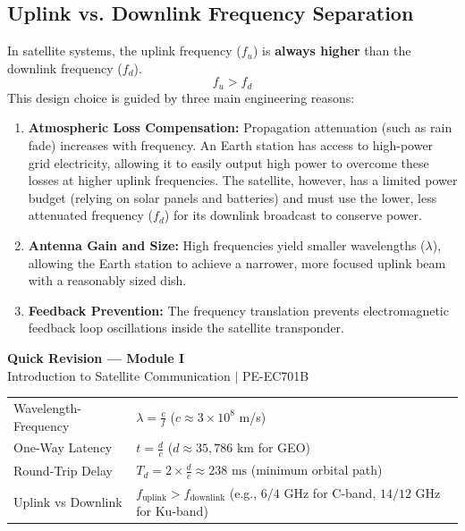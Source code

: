 \documentclass[12pt,a4paper]{article}
\renewcommand{\arraystretch}{1.45}
\begin{document}
\subsection{Uplink vs. Downlink Frequency Separation}
In satellite systems, the uplink frequency ($f_u$) is \textbf{always higher} than the downlink frequency ($f_d$).
\begin{equation}
  f_u > f_d
\end{equation}
This design choice is guided by three main engineering reasons:
\begin{enumerate}[label=\textbf{\alph*.}, leftmargin=*, itemsep=2pt]
  \item \textbf{Atmospheric Loss Compensation:} Propagation attenuation (such as rain fade) increases with frequency. An Earth station has access to high-power grid electricity, allowing it to easily output high power to overcome these losses at higher uplink frequencies. The satellite, however, has a limited power budget (relying on solar panels and batteries) and must use the lower, less attenuated frequency ($f_d$) for its downlink broadcast to conserve power.
  \item \textbf{Antenna Gain and Size:} High frequencies yield smaller wavelengths ($\lambda$), allowing the Earth station to achieve a narrower, more focused uplink beam with a reasonably sized dish.
  \item \textbf{Feedback Prevention:} The frequency translation prevents electromagnetic feedback loop oscillations inside the satellite transponder.
\end{enumerate}

\newpage
\begin{center}
  {\large\bfseries\color{myred} Quick Revision --- Module I}\\[3pt]
  {\small\color{mydark} Introduction to Satellite Communication $|$ PE-EC701B}
\end{center}
\noindent{\color{myred}\rule{\linewidth}{1.2pt}}
\vspace{4pt}

\begin{tcolorbox}[formulabox, title={\textbf{Key Formulas at a Glance}}]
\renewcommand{\arraystretch}{1.3}
\begin{tabularx}{\linewidth}{B{4.5cm} X}Wavelength-Frequency & $\lambda = \frac{c}{f}$ \quad ($c \approx 3 \times 10^8$ m/s) \\[6pt]
One-Way Latency & $t = \frac{d}{c}$ \quad ($d \approx 35,786$ km for GEO) \\[6pt]
Round-Trip Delay & $T_d = 2 \times \frac{d}{c} \approx 238 \text{ ms}$ (minimum orbital path) \\[6pt]
Uplink vs Downlink & $f_{\text{uplink}} > f_{\text{downlink}}$ \quad (e.g., $6/4$ GHz for C-band, $14/12$ GHz for Ku-band)
\end{tabularx}
\end{tcolorbox}
\end{document}
